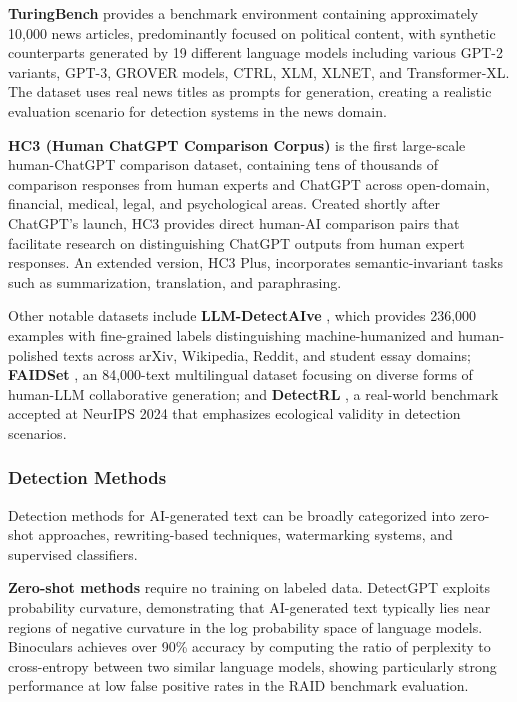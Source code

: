 \textbf{TuringBench} \cite{turingbench2022} provides a benchmark environment containing approximately 10,000 news articles, predominantly focused on political content, with synthetic counterparts generated by 19 different language models including various GPT-2 variants, GPT-3, GROVER models, CTRL, XLM, XLNET, and Transformer-XL. The dataset uses real news titles as prompts for generation, creating a realistic evaluation scenario for detection systems in the news domain.

\textbf{HC3 (Human ChatGPT Comparison Corpus)} \cite{hc32023} is the first large-scale human-ChatGPT comparison dataset, containing tens of thousands of comparison responses from human experts and ChatGPT across open-domain, financial, medical, legal, and psychological areas. Created shortly after ChatGPT's launch, HC3 provides direct human-AI comparison pairs that facilitate research on distinguishing ChatGPT outputs from human expert responses. An extended version, HC3 Plus, incorporates semantic-invariant tasks such as summarization, translation, and paraphrasing.

Other notable datasets include \textbf{LLM-DetectAIve} \cite{llmdetectaive2024}, which provides 236,000 examples with fine-grained labels distinguishing machine-humanized and human-polished texts across arXiv, Wikipedia, Reddit, and student essay domains; \textbf{FAIDSet} \cite{faidset2024}, an 84,000-text multilingual dataset focusing on diverse forms of human-LLM collaborative generation; and \textbf{DetectRL} \cite{detectrl2024}, a real-world benchmark accepted at NeurIPS 2024 that emphasizes ecological validity in detection scenarios.

\subsubsection{Detection Methods}

Detection methods for AI-generated text can be broadly categorized into zero-shot approaches, rewriting-based techniques, watermarking systems, and supervised classifiers.

\textbf{Zero-shot methods} require no training on labeled data. DetectGPT \cite{mitchell2023detectgptzeroshotmachinegeneratedtext} exploits probability curvature, demonstrating that AI-generated text typically lies near regions of negative curvature in the log probability space of language models. Binoculars \cite{hans2024spotting} achieves over 90\% accuracy by computing the ratio of perplexity to cross-entropy between two similar language models, showing particularly strong performance at low false positive rates in the RAID benchmark evaluation.

